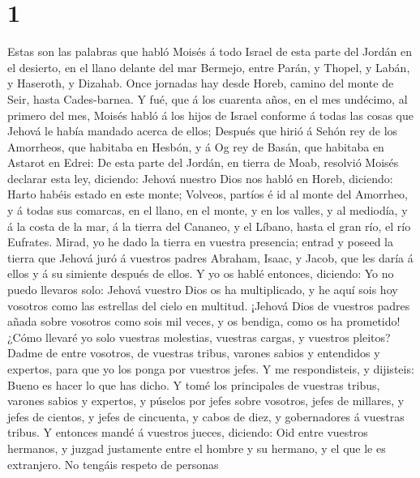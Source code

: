 \hypertarget{section}{%
\section{1}\label{section}}

 Estas son las palabras que habló Moisés á todo Israel de
esta parte del Jordán en el desierto, en el llano delante del mar
Bermejo, entre Parán, y Thopel, y Labán, y Haseroth, y Dizahab.
 Once jornadas hay desde Horeb, camino del monte de Seir,
hasta Cades-barnea.  Y fué, que á los cuarenta años, en el
mes undécimo, al primero del mes, Moisés habló á los hijos de Israel
conforme á todas las cosas que Jehová le había mandado acerca de ellos;
 Después que hirió á Sehón rey de los Amorrheos, que
habitaba en Hesbón, y á Og rey de Basán, que habitaba en Astarot en
Edrei:  De esta parte del Jordán, en tierra de Moab,
resolvió Moisés declarar esta ley, diciendo:  Jehová
nuestro Dios nos habló en Horeb, diciendo: Harto habéis estado en este
monte;  Volveos, partíos é id al monte del Amorrheo, y á
todas sus comarcas, en el llano, en el monte, y en los valles, y al
mediodía, y á la costa de la mar, á la tierra del Cananeo, y el Líbano,
hasta el gran río, el río Eufrates.  Mirad, yo he dado la
tierra en vuestra presencia; entrad y poseed la tierra que Jehová juró á
vuestros padres Abraham, Isaac, y Jacob, que les daría á ellos y á su
simiente después de ellos.  Y yo os hablé entonces,
diciendo: Yo no puedo llevaros solo:  Jehová vuestro Dios
os ha multiplicado, y he aquí sois hoy vosotros como las estrellas del
cielo en multitud.  ¡Jehová Dios de vuestros padres añada
sobre vosotros como sois mil veces, y os bendiga, como os ha prometido!
 ¿Cómo llevaré yo solo vuestras molestias, vuestras
cargas, y vuestros pleitos?  Dadme de entre vosotros, de
vuestras tribus, varones sabios y entendidos y expertos, para que yo los
ponga por vuestros jefes.  Y me respondisteis, y
dijisteis: Bueno es hacer lo que has dicho.  Y tomé los
principales de vuestras tribus, varones sabios y expertos, y púselos por
jefes sobre vosotros, jefes de millares, y jefes de cientos, y jefes de
cincuenta, y cabos de diez, y gobernadores á vuestras tribus.
 Y entonces mandé á vuestros jueces, diciendo: Oid entre
vuestros hermanos, y juzgad justamente entre el hombre y su hermano, y
el que le es extranjero.  No tengáis respeto de personas
